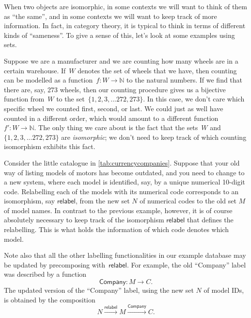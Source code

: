 When two objects are isomorphic, in some contexts we will want to think of them as ``the same'', and in some contexts we will want to keep track of more information. In fact, in category theory, it is typical to think in terms of different kinds of ``sameness''. To give a sense of this, let's look at some examples using sets. 

\begin{example}[Sizes]
Suppose we are a manufacturer and we are counting how many wheels are in a certain warehouse. If~$W$ denotes the set of wheels that we have, then counting can be modelled as a function~$f\colon W \to \mathbb{N}$ to the natural numbers. If we find that there are, say, 273 wheels, then our counting procedure gives us a bijective function from~$W$ to the set~$\{1, 2, 3,... 272, 273 \}$. In this case, we don't care which specific wheel we counted first, second, or last. We could just as well have counted in a different order, which would amount to a different function~$f'\colon W \to \mathbb{N}$. The only thing we care about is the fact that the sets~$W$ and~$\{1, 2, 3,... 272, 273 \}$ are \emph{isomorphic}; we don't need to keep track of which counting isomorphism exhibits this fact. 
\end{example}


\begin{example}[Relabelling]
Consider the little catalogue in \cref{tab:currencycompanies}. Suppose that your old way of listing models of motors has become outdated, and you need to change to a new system, where each model is identified, say, by a unique numerical 10-digit code. Relabelling each of the models with its numerical code corresponds to an isomorphism, say $\mathsf{relabel}$, from the new set $N$ of numerical codes to the old set $M$ of model names. In contrast to the previous example, however, it is of course absolutely necessary to keep track of the isomorphism $\mathsf{relabel}$ that defines the relabelling. This is what holds the information of which code denotes which model. 

Note also that all the other labelling functionalities in our example database may be updated by precomposing with~$\mathsf{relabel}$. For example, the old ``Company'' label was described by a function 
\begin{equation*}
\mathsf{Company}\colon M \to C.
\end{equation*}
The updated version of the ``Company'' label, using the new set $N$ of model IDs, is obtained by the composition
\begin{equation*}
N \overset{\mathsf{relabel}}{\longrightarrow} M \overset{\mathsf{Company}}{\longrightarrow} C.
\end{equation*}
\end{example}




